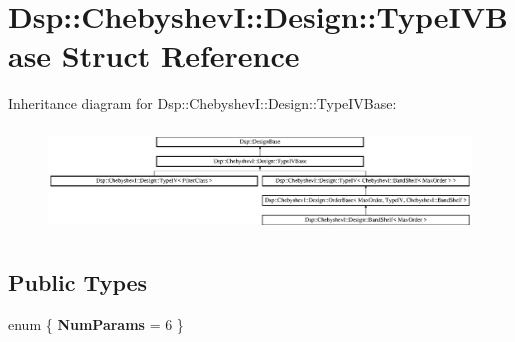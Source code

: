 \hypertarget{structDsp_1_1ChebyshevI_1_1Design_1_1TypeIVBase}{\section{Dsp\-:\-:Chebyshev\-I\-:\-:Design\-:\-:Type\-I\-V\-Base Struct Reference}
\label{structDsp_1_1ChebyshevI_1_1Design_1_1TypeIVBase}
}
Inheritance diagram for Dsp\-:\-:Chebyshev\-I\-:\-:Design\-:\-:Type\-I\-V\-Base\-:\begin{figure}[H]
\begin{center}
\leavevmode
\includegraphics[height=2.805611cm]{structDsp_1_1ChebyshevI_1_1Design_1_1TypeIVBase}
\end{center}
\end{figure}
\subsection*{Public Types}
\begin{DoxyCompactItemize}
\item 
enum \{ {\bfseries Num\-Params} =  6
 \}
\end{DoxyCompactItemize}
